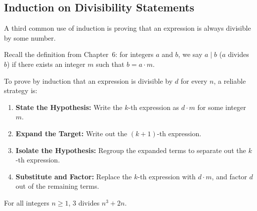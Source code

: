 \subsection{Induction on Divisibility Statements}

A third common use of induction is proving that an expression is always divisible by some number.

Recall the definition from Chapter~6: for integers $a$ and $b$, we say $a \mid b$ ($a$ divides $b$) if there exists an integer $m$ such that $b = a \cdot m$.

To prove by induction that an expression is divisible by $d$ for every $n$, a reliable strategy is:
\begin{enumerate}[label=\arabic*.]
\item \textbf{State the Hypothesis:} Write the $k$-th expression as $d \cdot m$ for some integer $m$.
\item \textbf{Expand the Target:} Write out the $(k+1)$-th expression.
\item \textbf{Isolate the Hypothesis:} Regroup the expanded terms to separate out the $k$-th expression.
\item \textbf{Substitute and Factor:} Replace the $k$-th expression with $d \cdot m$, and factor $d$ out of the remaining terms.
\end{enumerate}

\begin{theorem}
For all integers $n \ge 1$, $3$ divides $n^3 + 2n$.
\end{theorem}

